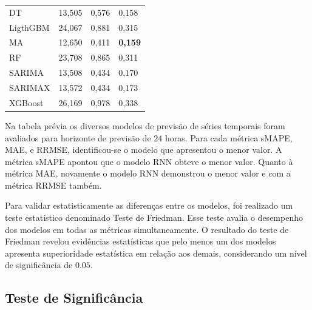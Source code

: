 \begin{table}[!htb]
\begin{tabular}{llll}
		DT                                  & 13,505                             & 0,576                            & 0,158                              \\
		LigthGBM                            & 24,067                             & 0,881                            & 0,315                              \\
		MA                                  & 12,650                             & 0,411                            & \textbf{0,159}                              \\
		RF                                  & 23,708                             & 0,865                            & 0,311                              \\
		SARIMA                              & 13,508                             & 0,434                            & 0,170                              \\
		SARIMAX                             & 13,572                             & 0,434                            & 0,173                              \\
		XGBoost                             & 26,169                             & 0,978                            & 0,338                              \\ \bottomrule

	\end{tabular}
\end{table}

Na tabela prévia os diversos modelos de previsão de séries temporais foram avaliados para horizonte de previsão de $24$ horas. Para cada métrica sMAPE, MAE, e RRMSE, identificou-se o modelo que apresentou o menor valor. A métrica sMAPE apontou que o modelo RNN obteve o menor valor. Quanto à métrica MAE, novamente o modelo RNN demonstrou o menor valor e com a métrica RRMSE também.

Para validar estatisticamente as diferenças entre os modelos, foi realizado um teste estatístico denominado Teste de Friedman. Esse teste avalia o desempenho dos modelos em todas as métricas simultaneamente. O resultado do teste de Friedman revelou evidências estatísticas que pelo menos um dos modelos apresenta superioridade estatística em relação aos demais, considerando um nível de significância de $0.05$.



\subsection{Teste de Signific\^ancia}

